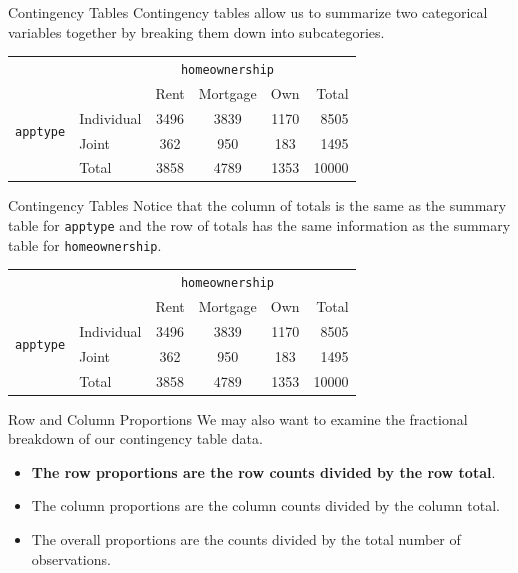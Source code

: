 \begin{frame}{Contingency Tables}
    \vspace{12pt}Contingency tables allow us to summarize two categorical variables together by breaking them down into subcategories. 
    \begin{center}
        \begin{tabular}{r l ccc r}
		& & \multicolumn{3}{c}{{\texttt{homeownership}}} & \\
        \cline{3-5}
		& & Rent & Mortgage & Own & Total  \\ 
        \cline{2-6}
        \multirow{2}{*}{{\texttt{apptype}}} 
        & Individual & 3496 & 3839 & 1170 & 8505 \\ 
  		& Joint & 362 & 950 & 183 & 1495 \\ 
        \cline{2-6}
  		& Total	& 3858 & 4789 & 1353 & 10000 \\
        \cline{2-6}
    \end{tabular}
    \end{center}
\end{frame}

\begin{frame}{Contingency Tables}
    Notice that the column of totals is the same as the summary table for \texttt{apptype} and the row of totals has the same information as the summary table for \texttt{homeownership}. 
    \begin{center}
        \begin{tabular}{r l ccc r}
		& & \multicolumn{3}{c}{{\texttt{homeownership}}} & \\
        \cline{3-5}
		& & Rent & Mortgage & Own & Total  \\ 
        \cline{2-6}
        \multirow{2}{*}{{\texttt{apptype}}} 
        & Individual & 3496 & 3839 & 1170 & 8505 \\ 
  		& Joint & 362 & 950 & 183 & 1495 \\ 
        \cline{2-6}
  		& Total	& 3858 & 4789 & 1353 & 10000 \\
        \cline{2-6}
    \end{tabular}
    \end{center}
\end{frame}

\begin{frame}{Row and Column Proportions}
    We may also want to examine the fractional breakdown of our contingency table data.
    \begin{itemize}
        \item \textbf{The row proportions are the row counts divided by the row total}.
        \item The column proportions are the column counts divided by the column total.
        \item The overall proportions are the counts divided by the total number of observations. 
    \end{itemize}
\end{frame}

